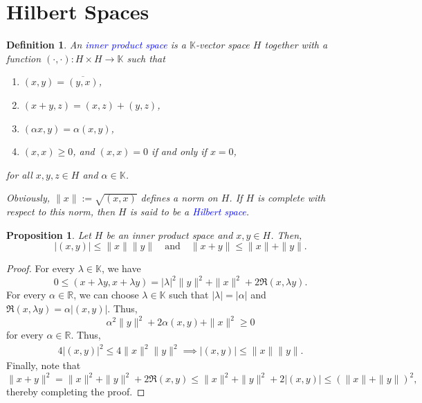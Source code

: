 \documentclass[11pt]{article}
\theoremstyle{thmstyle}
\newtheorem{proposition}[theorem]{Proposition}
\theoremstyle{defstyle}
\newtheorem{definition}[theorem]{Definition}
\newcommand{\R}{\mathbb{R}}
\newcommand{\bbC}{\mathbb{C}}
\newcommand{\K}{\mathbb{K}} %
\newcommand{\define}[1]{\textcolor{blue}{\textit{#1}}}
\renewcommand{\le}{\leqslant}
\renewcommand{\ge}{\geqslant}
\begin{document}
\section{Hilbert Spaces}

\begin{definition}
    An \define{inner product space} is a $\K$-vector space $H$ together with a function $(\cdot, \cdot): H\times H\to \K$ such that 
    \begin{enumerate}[label=(\roman*)]
        \item $(x, y) = \overline{(y, x)}$, 
        \item $(x + y, z) = (x, z) + (y, z)$, 
        \item $(\alpha x, y) = \alpha(x, y)$, 
        \item $(x, x)\ge 0$, and $(x, x) = 0$ if and only if $x = 0$,
    \end{enumerate}
    for all $x,y, z\in H$ and $\alpha\in\K$.

    Obviously, $\|x\|:= \sqrt{(x, x)}$ defines a norm on $H$. If $H$ is complete with respect to this norm, then $H$ is said to be a \define{Hilbert space}.
\end{definition}

\begin{proposition}
    Let $H$ be an inner product space and $x,y\in H$. Then, 
    \begin{equation*}
        |(x, y)|\le\|x\|\|y\|\quad\text{and}\quad\|x + y\|\le\|x\| + \|y\|.
    \end{equation*}
\end{proposition}
\begin{proof}
    For every $\lambda\in\K$, we have 
    \begin{equation*}
        0\le(x + \lambda y, x + \lambda y) = |\lambda|^2\|y\|^2 + \|x\|^2 + 2\Re(x,\lambda y).
    \end{equation*}
    For every $\alpha\in\R$, we can choose $\lambda\in\K$ such that $|\lambda| = |\alpha|$ and $\Re(x, \lambda y) = \alpha |(x,y)|$. Thus, 
    \begin{equation*}
        \alpha^2\|y\|^2 + 2\alpha(x, y) + \|x\|^2\ge 0
    \end{equation*}
    for every $\alpha\in\R$. Thus, 
    \begin{align}
        4|(x, y)|^2\le 4\|x\|^2\|y\|^2\implies |(x, y)|\le\|x\|\|y\|.
    \end{align}
    Finally, note that 
    \begin{equation*}
        \|x + y\|^2 = \|x\|^2 + \|y\|^2 + 2\Re(x, y)\le \|x\|^2 + \|y\|^2 + 2|(x, y)|\le  (\|x\| + \|y\|)^2,
    \end{equation*}
    thereby completing the proof.
\end{proof}
\end{document}
